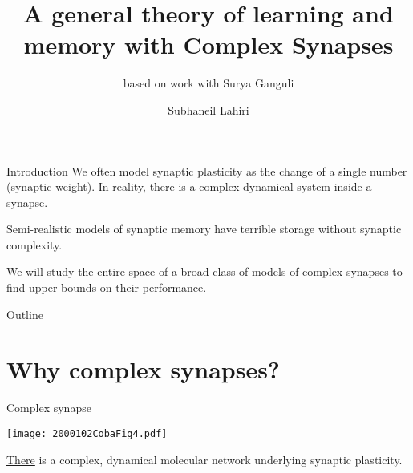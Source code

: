 \documentclass{beamer}%
\title[Complex synapses]{A general theory of learning and memory with Complex Synapses}
\subtitle{\small{based on work with Surya Ganguli}
}
\author{Subhaneil Lahiri%
}
\institute[Stanford]{%
Stanford University, Applied Physics
}
\begin{document}

\begin{frame}
%
 \titlepage
%
\end{frame}


\begin{frame}{Introduction}
%
 We often model synaptic plasticity as the change of a single number (synaptic weight).
 In reality, there is a complex dynamical system inside a synapse.

 \vp Semi-realistic models of synaptic memory have terrible storage without synaptic complexity.

 \vp We will study the entire space of a broad class of models of complex synapses to find upper bounds on their performance.

%
\end{frame}


\begin{frame}{Outline}
%
 \tableofcontents[hideallsubsections]
%
\end{frame}


\section{Why complex synapses?}


\begin{frame}[label=fr_net]{Complex synapse}
%
 \begin{center}
 \texttt{[image: 2000102CobaFig4.pdf]}
 \end{center}
 \hyperlink{fr_questions}{There} is a complex, dynamical molecular network underlying synaptic plasticity.
%
\end{frame}
\end{document}
